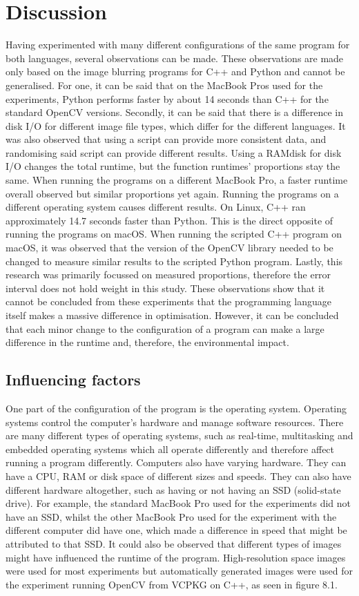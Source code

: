 \chapter{Discussion}
Having experimented with many different configurations of the same program for both languages, several observations can be made. These observations are made only based on the image blurring programs for C++ and Python and cannot be generalised.
For one, it can be said that on the MacBook Pros used for the experiments, Python performs faster by about 14 seconds than C++ for the standard OpenCV versions. Secondly, it can be said that there is a difference in disk I/O for different image file types, which differ for the different languages. It was also observed that using a script can provide more consistent data, and randomising said script can provide different results. Using a RAMdisk for disk I/O changes the total runtime, but the function runtimes' proportions stay the same. When running the programs on a different MacBook Pro,  a faster runtime overall observed but similar proportions yet again. Running the programs on a different operating system causes different results. On Linux, C++ ran approximately 14.7 seconds faster than Python. This is the direct opposite of running the programs on macOS. When running the scripted C++ program on macOS, it was observed that the version of the OpenCV library needed to be changed to measure similar results to the scripted Python program. Lastly, this research was primarily focussed on measured proportions, therefore the error interval does not hold weight in this study.
These observations show that it cannot be concluded from these experiments that the programming language itself makes a massive difference in optimisation. However, it can be concluded that each minor change to the configuration of a program can make a large difference in the runtime and, therefore, the environmental impact.

\section{Influencing factors}
One part of the configuration of the program is the operating system. Operating systems control the computer’s hardware and manage software resources. There are many different types of operating systems, such as real-time, multitasking and embedded operating systems which all operate differently and therefore affect running a program differently.
Computers also have varying hardware. They can have a CPU, RAM or disk space of different sizes and speeds. They can also have different hardware altogether, such as having or not having an SSD (solid-state drive). For example, the standard MacBook Pro used for the experiments did not have an SSD, whilst the other MacBook Pro used for the experiment with the different computer did have one, which made a difference in speed that might be attributed to that SSD.
It could also be observed that different types of images might have influenced the runtime of the program. High-resolution space images were used for most experiments but automatically generated images were used for the experiment running OpenCV from VCPKG on C++, as seen in figure 8.1.

